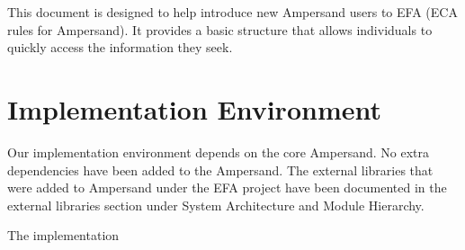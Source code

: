 This document is designed to help introduce new Ampersand users to EFA 
(ECA rules for Ampersand). It provides a basic structure that allows 
individuals to quickly access the information they seek. 
 
 
 \section{Implementation Environment}
Our implementation environment depends on the core Ampersand. No extra dependencies have been added to the Ampersand. The external libraries that were added to Ampersand under the EFA project have been documented in the external libraries section under System Architecture and Module Hierarchy.

The implementation
%